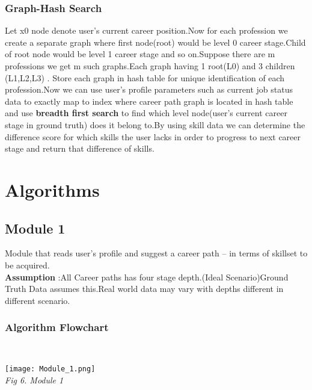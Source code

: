 \documentclass[journal]{IEEEtran}
\begin{document}
   \subsubsection{\textbf{Graph-Hash Search}}
        Let x0 node denote user's current career position.Now for each profession we create a separate graph where first node(root) would be level 0 career stage.Child of root node would be level 1 career stage and so on.Suppose there are m professions we get m such graphs.Each graph having 1 root(L0) and 3 children (L1,L2,L3) .
        Store each graph in hash table for unique identification of each profession.Now we can use user's profile parameters such as current job status data to exactly map to index where career path graph is located in hash table and use \textbf{breadth first search} to find which level node(user's current career stage in ground truth) does it belong to.By using skill data we can determine the difference score for which skills the user lacks in order to progress to next career stage and return that difference of skills. 
    
\section{\textbf{Algorithms}}

    \subsection{\textbf{Module 1}}
    Module that reads user’s profile and suggest a career path – in terms of skillset to be acquired.
    \\\textbf{Assumption} :All Career paths has four stage depth.(Ideal Scenario)Ground Truth Data assumes this.Real world data may vary with depths different in different scenario.        
        \\
        \subsubsection{\textbf{Algorithm Flowchart}}
        \\
            \begin{center}
                \texttt{[image: Module\_1.png]}
                \\
                \caption{\textit{Fig 6. Module 1}}
            \end{center}
        \\
    
\end{document}
